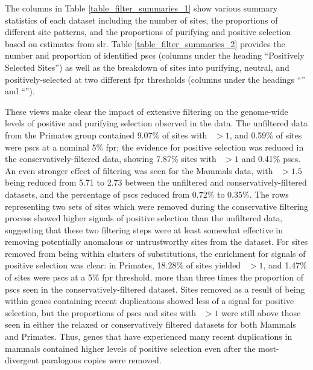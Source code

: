 The columns in Table \ref{table_filter_summaries_1} show various
summary statistics of each \sw dataset including the number of sites,
the proportions of different site patterns, and the proportions of
purifying and positive selection based on \omgml estimates from
\ac{slr}. Table \ref{table_filter_summaries_2} provides the number and
proportion of identified \acp{psc} (columns under the heading
``Positively Selected Sites'') as well as the breakdown of sites into
purifying, neutral, and positively-selected at two different \ac{fpr}
thresholds (columns under the headings ``'' and
``'').

These views make clear the impact of extensive filtering on the
genome-wide levels of positive and purifying selection observed in the
data. The unfiltered data from the Primates group contained 9.07\% of
sites with \omgml~$>1$, and 0.59\% of sites were \acp{psc} at a
nominal 5\% \ac{fpr}; the evidence for positive selection was reduced
in the conservatively-filtered data, showing 7.87\% sites with
\omgml~$>1$ and 0.41\% \acp{psc}. An even stronger effect of filtering
was seen for the Mammals data, with \omgml~$>1.5$ being reduced from
5.71 to 2.73 between the unfiltered and conservatively-filtered
datasets, and the percentage of \acp{psc} reduced from 0.72\% to
0.35\%. The rows representing two sets of sites which were removed
during the conservative filtering process showed higher signals of
positive selection than the unfiltered data, suggesting that these two
filtering steps were at least somewhat effective in removing
potentially anomalous or untrustworthy sites from the dataset. For
sites removed from being within clusters of \nsyn substitutions, the
enrichment for signals of positive selection was clear: in Primates,
18.28\% of sites yielded \omgml~$>1$, and 1.47\% of sites were
\acp{psc} at a 5\% \ac{fpr} threshold, more than three times the
proportion of \acp{psc} seen in the conservatively-filtered
dataset. Sites removed as a result of being within genes containing
recent duplications showed less of a signal for positive selection,
but the proportions of \acp{psc} and sites with \omgml~$>1$ were still
above those seen in either the relaxed or conservatively filtered
datasets for both Mammals and Primates. Thus, genes that have
experienced many recent duplications in mammals contained higher
levels of positive selection even after the most-divergent paralogous
copies were removed.

